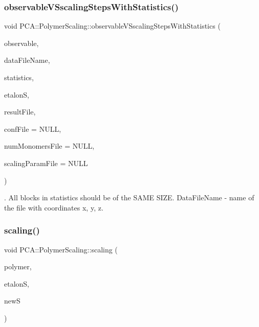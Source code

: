 \subsubsection{\texorpdfstring{observable\+V\+Sscaling\+Steps\+With\+Statistics()}{observableVSscalingStepsWithStatistics()}}
{\footnotesize\ttfamily void P\+C\+A\+::\+Polymer\+Scaling\+::observable\+V\+Sscaling\+Steps\+With\+Statistics (\begin{DoxyParamCaption}\item[{\hyperlink{class_p_c_a_1_1_polymer_scaling_aa4112660455a10f29c208c96655718c0}{Polymer\+Scaling\+::\+Observable}}]{observable,  }\item[{char $\ast$}]{data\+File\+Name,  }\item[{int}]{statistics,  }\item[{const \hyperlink{class_p_c_a_1_1_polymer_scaling_1_1_scaling_param}{Scaling\+Param} \&}]{etalonS,  }\item[{char $\ast$}]{result\+File,  }\item[{char $\ast$}]{conf\+File = {\ttfamily NULL},  }\item[{char $\ast$}]{num\+Monomers\+File = {\ttfamily NULL},  }\item[{char $\ast$}]{scaling\+Param\+File = {\ttfamily NULL} }\end{DoxyParamCaption})\hspace{0.3cm}{\ttfamily [static]}}





. All blocks in statistics should be of the S\+A\+ME S\+I\+ZE. Data\+File\+Name -\/ name of the file with coordinates x, y, z. \hypertarget{class_p_c_a_1_1_polymer_scaling_a209214a658e1da7ccc0e520742cd1e3d}{}\label{class_p_c_a_1_1_polymer_scaling_a209214a658e1da7ccc0e520742cd1e3d} 
\subsubsection{\texorpdfstring{scaling()}{scaling()}}
{\footnotesize\ttfamily void P\+C\+A\+::\+Polymer\+Scaling\+::scaling (\begin{DoxyParamCaption}\item[{\hyperlink{class_p_c_a_1_1_polymer}{Polymer} $\ast$$\ast$}]{polymer,  }\item[{const \hyperlink{class_p_c_a_1_1_polymer_scaling_1_1_scaling_param}{Scaling\+Param} \&}]{etalonS,  }\item[{\hyperlink{class_p_c_a_1_1_polymer_scaling_1_1_scaling_param}{Scaling\+Param} $\ast$}]{newS }\end{DoxyParamCaption})\hspace{0.3cm}{\ttfamily [static]}}

